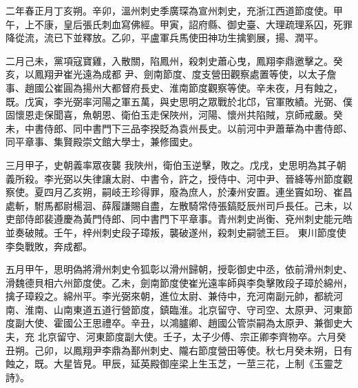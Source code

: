 \begin{pinyinscope}
 二年春正月丁亥朔。辛卯，溫州刺史季廣琛為宣州刺史，充浙江西道節度使。甲午，上不康，皇后張氏刺血寫佛經。甲寅，詔府縣、御史臺、大理疏理系囚，死罪降從流，流已下並釋放。乙卯，平盧軍兵馬使田神功生擒劉展，揚、潤平。



 二月己未，黨項寇寶雞，入散關，陷鳳州，殺刺史蕭心曳，鳳翔李鼎邀擊之。癸亥，以鳳翔尹崔光遠為成都
 尹、劍南節度、度支營田觀察處置等使，以太子詹事、趙國公崔圓為揚州大都督府長史、淮南節度觀察等使。辛未夜，月有蝕之，既。戊寅，李光弼率河陽之軍五萬，與史思明之眾戰於北邙，官軍敗績。光弼、僕固懷恩走保聞喜，魚朝恩、衛伯玉走保陜州，河陽、懷州共陷賊，京師戒嚴。癸未，中書侍郎、同中書門下三品李揆貶為袁州長史。以前河中尹蕭華為中書侍郎、同平章事、集賢殿崇文館大學士，兼修國史。



 三月甲子，史朝義率眾夜襲
 我陜州，衛伯玉逆擊，敗之。戊戌，史思明為其子朝義所殺。李光弼以失律讓太尉、中書令，許之，授侍中、河中尹、晉絳等州節度觀察使。夏四月乙亥朔，嗣岐王珍得罪，廢為庶人，於溱州安置。連坐竇如玢、崔昌處斬，駙馬都尉楊洄、薛履謙賜自盡，左散騎常侍張鎬貶辰州司戶長任。己未，以吏部侍郎裴遵慶為黃門侍郎、同中書門下平章事。青州刺史尚衡、兗州刺史能元皓並奏破賊。壬午，梓州刺史段子璋叛，襲破遂州，殺刺史嗣虢王巨。
 東川節度使李奐戰敗，奔成都。



 五月甲午，思明偽將滑州刺史令狐彰以滑州歸朝，授彰御史中丞，依前滑州刺史、滑魏德貝相六州節度使。乙未，劍南節度使崔光遠率師與李奐擊敗段子璋於綿州，擒子璋殺之。綿州平。李光弼來朝，進位太尉、兼侍中，充河南副元帥，都統河南、淮南、山南東道五道行營節度，鎮臨淮。北京留守、守司空、太原尹、河東節度副大使、霍國公王思禮卒。辛丑，以鴻臚卿、趙國公管崇嗣為太原尹、兼御史大夫，充
 北京留守、河東節度副大使。壬子，太子少傅、宗正卿李齊物卒。六月癸丑朔。己卯，以鳳翔尹李鼎為鄯州刺史、隴右節度營田等使。秋七月癸未朔，日有蝕之，既。大星皆見。甲辰，延英殿御座梁上生玉芝，一莖三花，上制《玉靈芝詩》。




\end{pinyinscope}
